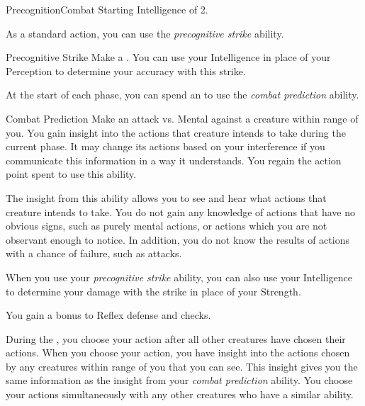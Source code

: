     \begin{feat}{Precognition}{Combat}
        \featpre Starting Intelligence of 2.

         As a standard action, you can use the \textit{precognitive strike} ability.
        \begin{ability}{Precognitive Strike}
            Make a .
            You can use your Intelligence in place of your Perception to determine your accuracy with this strike.
        \end{ability}

         At the start of each phase, you can spend an  to use the \textit{combat prediction} ability.
        \begin{ability}{Combat Prediction}
            Make an attack vs. Mental against a creature within \rngmed range of you.
            \hit You gain insight into the actions that creature intends to take during the current phase.
                It may change its actions based on your interference if you communicate this information in a way it understands.
            \miss You regain the action point spent to use this ability.

            The insight from this ability allows you to see and hear what actions that creature intends to take.
            You do not gain any knowledge of actions that have no obvious signs, such as purely mental actions, or actions which you are not observant enough to notice.
            In addition, you do not know the results of actions with a chance of failure, such as attacks.
        \end{ability}

         When you use your \textit{precognitive strike} ability, you can also use your Intelligence to determine your damage with the strike in place of your Strength.

         You gain a  bonus to Reflex defense and  checks.

         During the , you choose your action after all other creatures have chosen their actions.
        When you choose your action, you have insight into the actions chosen by any creatures within \rngclose range of you that you can see.
        This insight gives you the same information as the insight from your \textit{combat prediction} ability.
        You choose your actions simultaneously with any other creatures who have a similar ability.


\end{feat}
